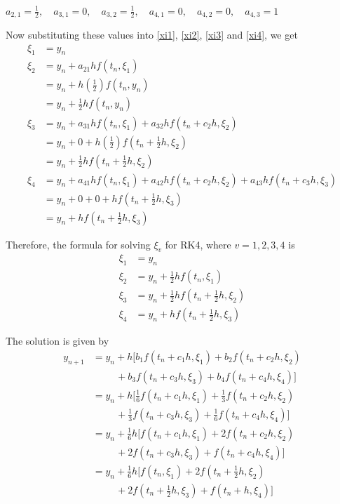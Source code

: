 \documentclass[12pt,a4paper]{article}
\begin{document}
\hspace{2pt}

$ a_{2,1} = \frac{1}{2},\quad a_{3,1} = 0,\quad a_{3,2} = \frac{1}{2},\quad a_{4,1} = 0,\quad a_{4,2} = 0,\quad a_{4,3} = 1 $

\hspace{2pt}
Now substituting these values into \ref{xi1}, \ref{xi2}, \ref{xi3} and \ref{xi4}, we get
\begin{align*}
\xi_1 &= y_n \\ 
\xi_2 &= y_n + a_{21}h f (t_n, \xi_1 ) \\ 
&= y_n + h\left( \frac{1}{2}\right) f(t_n,y_n) \\
&= y_n + \frac{1}{2}hf(t_n,y_n) \\
\xi_3 &= y_n + a_{31}h f (t_n, \xi_1 ) + a_{32}h f (t_n + c_2h, \xi_2 ) \\ 
&= y_n + 0 + h\left( \frac{1}{2}\right) f\left( t_n + \frac{1}{2}h, \xi_2 \right)  \\
&= y_n + \frac{1}{2}hf\left( t_n + \frac{1}{2}h, \xi_2 \right)  \\
\xi_4 &= y_n + a_{41}h f(t_n, \xi_1 ) + a_{42}h f (t_n + c_2h, \xi_2 ) + a_{43}h f(t_n + c_3h, \xi_3 ) \\
&= y_n + 0 + 0 + hf\left( t_n + \frac{1}{2}h, \xi_3\right)  \\
&= y_n + hf\left( t_n + \frac{1}{2}h,\xi_3\right)    
\end{align*}

Therefore, the formula for solving $\xi_v$ for RK4, where $v=1,2,3,4$ is 
\begin{align*}
\xi_1 &= y_n \\
\xi_2 &= y_n + \frac{1}{2}hf(t_n,\xi_1) \\
\xi_3 &= y_n + \frac{1}{2}hf\left( t_n + \frac{1}{2}h, \xi_2 \right)  \\
\xi_4 &= y_n + hf\left( t_n + \frac{1}{2}h, \xi_3\right) 
\end{align*}

The solution is given by
\begin{align*}
y_{n+1} &= y_n + h [b_1f(t_n + c_1h , \xi_1 ) + b_2f(t_n + c_2h , \xi_2 )\\
&\hspace{1cm}+ b_3f(t_n + c_3h , \xi_3 )+ b_4f(t_n + c_4h , \xi_4 )]  \\
&= y_n + h [ \frac{1}{6}f(t_n + c_1h , \xi_1 )+ \frac{1}{3}f(t_n + c_2h , \xi_2) \\
&\hspace{1cm} + \frac{1}{3}f(t_n + c_3h , \xi_3 ) + \frac{1}{6}f(t_n + c_4h , \xi_4 )]  \\
&= y_n + \frac{1}{6}h[ f(t_n + c_1h , \xi_1 ) + 2f(t_n + c_2h , \xi_2) \\
&\hspace{1cm}+ 2f(t_n + c_3h , \xi_3 ) + f(t_n + c_4h , \xi_4)] \\
&= y_n + \frac{1}{6}h[ f(t_n , \xi_1 ) + 2f(t_n + \frac{1}{2} h , \xi_2) \\
&\hspace{1cm}+ 2f(t_n + \frac{1}{2} h , \xi_3 ) + f(t_n + h , \xi_4)] 
\end{align*}
\end{document}
